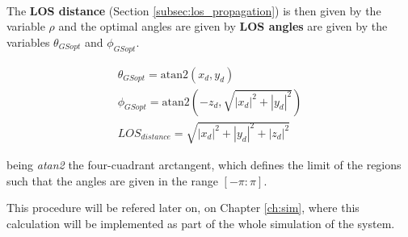 \paragraph{} The \textbf{LOS distance} (Section \ref{subsec:los_propagation}) is then given by the variable $\rho$ and the optimal angles are given by \textbf{LOS angles} are given by the variables $\theta_{GSopt}$ and $\phi_{GSopt}$.

\begin{align}
  \theta_{GSopt} = \text{atan2}\left(x_{d}, y_{d}\right)\\
  \phi_{GSopt}=  \text{atan2}\left(-z_{d}, \sqrt{|x_{d}|^{2}+|y_{d}|^{2}}\right)\\
  LOS_{distance} = \sqrt{|x_{d}|^{2}+|y_{d}|^{2}+|z_{d}|^{2}}
  \label{eq:OptGS}
\end{align}

being \textit{atan2} the four-cuadrant arctangent, which defines the limit of the regions such that the angles are given in the range $[-\pi:\pi]$.

This procedure will be refered later on, on Chapter \ref{ch:sim}, where this calculation will be implemented as part of the whole simulation of the system.

